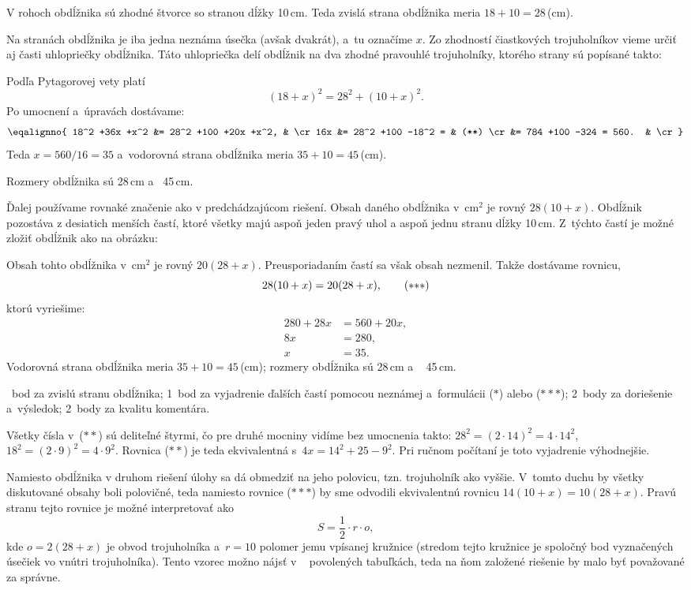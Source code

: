 {%
V rohoch obdĺžnika sú zhodné štvorce so stranou dĺžky 10\,cm.
Teda zvislá strana obdĺžnika meria $18+10=28$\,(cm).

Na stranách obdĺžnika je iba jedna neznáma úsečka (avšak dvakrát), a~tu označíme $x$.
Zo zhodností čiastkových trojuholníkov vieme určiť aj časti uhlopriečky obdĺžnika.
Táto uhlopriečka delí obdĺžnik na dva zhodné pravouhlé trojuholníky, ktorého strany sú popísané takto:
%

Podľa Pytagorovej vety platí
$$
(18+x)^2 = 28^2 +(10+x)^2 .
\tag{$*$}
$$
Po umocnení a~úpravách dostávame:
$$
\eqalignno{
	18^2 +36x +x^2 &= 28^2 +100 +20x +x^2, & \cr
	16x &= 28^2 +100 -18^2 = & (**) \cr
	    &= 784 +100 -324 = 560. & \cr
}
$$
Teda $x =560/16 = 35$ a~vodorovná strana obdĺžnika meria $35+10=45$\,(cm).

Rozmery obdĺžnika sú 28\,cm a ~45\,cm.

\ineriesenie
Ďalej používame rovnaké značenie ako v predchádzajúcom riešení.
Obsah daného obdĺžnika v~cm$^2$ je rovný $28(10+x)$.
Obdĺžnik pozostáva z desiatich menších častí, ktoré všetky majú aspoň jeden pravý uhol a aspoň jednu stranu dĺžky 10\,cm.
Z~týchto častí je možné zložiť obdĺžnik ako na obrázku:
%

Obsah tohto obdĺžnika v~cm$^2$ je rovný $20(28+x)$.
Preusporiadaním častí sa však obsah nezmenil.
Takže dostávame rovnicu,
$$
28(10+x) = 20(28+x),
\tag{$*{*}*$}
$$
ktorú vyriešime:
$$
\begin{aligned}
  280+28x &=560+20x, \\
	8x &= 280, \\
	x &=35.
\end{aligned}
$$
Vodorovná strana obdĺžnika meria $35+10=45$\,(cm); rozmery obdĺžnika sú 28\,cm a ~ 45\,cm.

~bod za zvislú stranu obdĺžnika;
1~bod za vyjadrenie ďalších častí pomocou neznámej a~formulácii ($*$) alebo ($*{*}*$);
2~body za doriešenie a~výsledok;
2~body za kvalitu komentára.
\endhodnotenie

\poznamky
Všetky čísla v~($**$) sú deliteľné štyrmi,
čo pre druhé mocniny vidíme bez umocnenia takto: $28^2=(2\cdot14)^2=4\cdot14^2$, $18^2=(2\cdot9)^2=4\cdot9^2$.
Rovnica ($**$) je teda ekvivalentná s~$4x =14^2+25-9^2$.
Pri ručnom počítaní je toto vyjadrenie výhodnejšie.

Namiesto obdĺžnika v druhom riešení úlohy sa dá obmedziť na jeho polovicu, tzn. trojuholník ako vyššie.
V~tomto duchu by všetky diskutované obsahy boli polovičné, teda namiesto rovnice ($*{*}*$) by sme odvodili ekvivalentnú rovnicu
$14(10+x)=10(28+x)$.
Pravú stranu tejto rovnice je možné interpretovať ako
$$
S=\frac12\cdot r\cdot o,
$$
kde $o=2(28+x)$ je obvod trojuholníka a~$r=10$ polomer jemu vpísanej kružnice
(stredom tejto kružnice je spoločný bod vyznačených úsečiek vo vnútri trojuholníka).
Tento vzorec možno nájsť v ~ povolených tabuľkách, teda na ňom založené riešenie by malo byť považované za správne.
}

